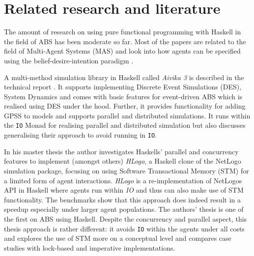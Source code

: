 \section{Related research and literature}
\label{sec:literature}

The amount of research on using pure functional programming with Haskell in the field of ABS has been moderate so far. Most of the papers are related to the field of Multi-Agent Systems (MAS) and look into how agents can be specified using the belief-desire-intention paradigm \cite{de_jong_suitability_2014,jankovic_functional_2007,sulzmann_specifying_2007}.

A multi-method simulation library in Haskell called \textit{Aivika 3} is described in the technical report \cite{sorokin_aivika_2015}. It supports implementing Discrete Event Simulations (DES), System Dynamics and comes with basic features for event-driven ABS which is realised using DES under the hood. Further, it provides functionality for adding GPSS to models and supports parallel and distributed simulations. It runs within the \texttt{IO} Monad for realising parallel and distributed simulation but also discusses generalising their approach to avoid running in \texttt{IO}.

In his master thesis \cite{bezirgiannis_improving_2013} the author investigates Haskells' parallel and concurrency features to implement (amongst others) \textit{HLogo}, a Haskell clone of the NetLogo \cite{wilensky_introduction_2015} simulation package, focusing on using Software Transactional Memory (STM) for a limited form of agent interactions. \textit{HLogo} is a re-implementation of NetLogos API in Haskell where agents run within \textit{IO} and thus can also make use of STM functionality. The benchmarks show that this approach does indeed result in a speedup especially under larger agent populations. The authors' thesis is one of the first on ABS using Haskell. Despite the concurrency and parallel aspect, this thesis approach is rather different: it avoids \texttt{IO} within the agents under all costs and explores the use of STM more on a conceptual level and compares case studies with lock-based and imperative implementations.

